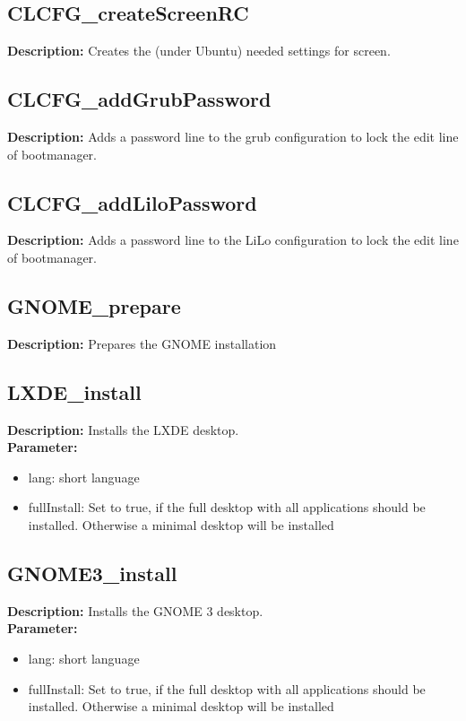 \subsection{CLCFG\_createScreenRC}
\textbf{Description:} Creates the (under Ubuntu) needed settings for screen.\\

\subsection{CLCFG\_addGrubPassword}
\textbf{Description:} Adds a password line to the grub configuration to lock the edit line of bootmanager.\\

\subsection{CLCFG\_addLiloPassword}
\textbf{Description:} Adds a password line to the LiLo configuration to lock the edit line of bootmanager.\\

\subsection{GNOME\_prepare}
\textbf{Description:} Prepares the GNOME installation\\

\subsection{LXDE\_install}
\textbf{Description:} Installs the LXDE desktop.\\
\textbf{Parameter:}
\begin{itemize}
\item lang: short language
\item fullInstall: Set to true, if the full desktop with all applications should be installed. Otherwise a minimal desktop will be installed
\end{itemize}

\subsection{GNOME3\_install}
\textbf{Description:} Installs the GNOME 3 desktop.\\
\textbf{Parameter:}
\begin{itemize}
\item lang: short language
\item fullInstall: Set to true, if the full desktop with all applications should be installed. Otherwise a minimal desktop will be installed
\end{itemize}

